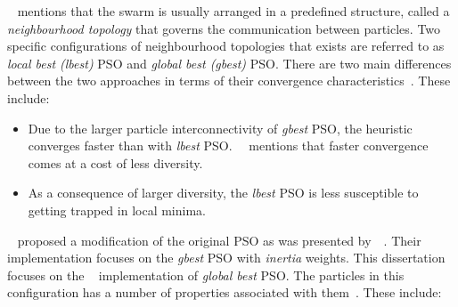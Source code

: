 \citeauthor{ref:vanwyk:2014}~\cite{ref:vanwyk:2014} mentions that the swarm is usually arranged in a predefined structure, called a \textit{neighbourhood topology} that governs the communication between particles. Two specific configurations of neighbourhood topologies that exists are referred to as \textit{local best (lbest)} \acs{PSO} and \textit{global best (gbest)} \acs{PSO}. There are two main differences between the two approaches in terms of their convergence characteristics~\cite{ref:eberhart:1996}. These include:

\begin{itemize}
      \item Due to the larger particle interconnectivity of \textit{gbest} \acs{PSO}, the heuristic converges faster than with \textit{lbest} \acs{PSO}.~\citeauthor{ref:engelbrecht:2007}~\cite{ref:engelbrecht:2007} mentions that faster convergence comes at a cost of less diversity.

      \item As a consequence of larger diversity, the \textit{lbest} \acs{PSO} is less susceptible to getting trapped in local minima.
\end{itemize}

\noindent
\citeauthor{ref:shi:1998}~\cite{ref:shi:1998} proposed a modification of the original \acs{PSO} as was presented by~\citeauthor{ref:kennedy:1995}~\cite{ref:kennedy:1995}. Their implementation focuses on the \textit{gbest} \acs{PSO} with \textit{inertia} weights. This dissertation focuses on the \citeauthor{ref:shi:1998}~\cite{ref:shi:1998} implementation of \textit{global best} \acs{PSO}. The particles in this configuration has a number of properties associated with them~\cite{ref:vanwyk:2014}. These include:

